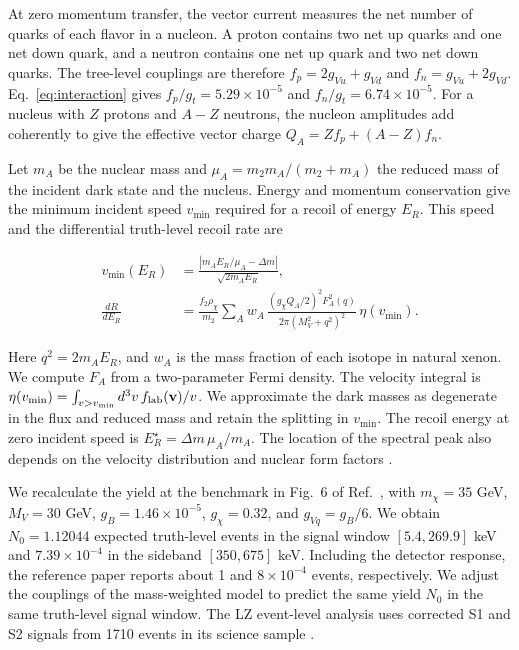 \documentclass[aps,prd,reprint,superscriptaddress,longbibliography,floatfix]{revtex4-2}
\begin{document}
At zero momentum transfer, the vector current measures the net number of quarks of each flavor in a nucleon. A proton contains two net up quarks and one net down quark, and a neutron contains one net up quark and two net down quarks. The tree-level couplings are therefore $f_p=2g_{Vu}+g_{Vd}$ and $f_n=g_{Vu}+2g_{Vd}$. Eq.~\eqref{eq:interaction} gives $f_p/g_t=5.29\times10^{-5}$ and $f_n/g_t=6.74\times10^{-5}$. For a nucleus with $Z$ protons and $A-Z$ neutrons, the nucleon amplitudes add coherently to give the effective vector charge $Q_A=Zf_p+(A-Z)f_n$.

Let $m_A$ be the nuclear mass and $\mu_A=m_2m_A/(m_2+m_A)$ the reduced mass of the incident dark state and the nucleus. Energy and momentum conservation give the minimum incident speed $v_{\min}$ required for a recoil of energy $E_R$. This speed and the differential truth-level recoil rate are

\begin{equation}
\label{eq:recoil}
\begin{aligned}
v_{\min}(E_R)&=\frac{|m_A E_R/\mu_A-\Delta m|}{\sqrt{2m_A E_R}},\\
\frac{dR}{dE_R}&=\frac{f_2\rho_\chi}{m_2}\sum_A w_A\,
\frac{(g_\chi Q_A/2)^2 F_A^2(q)}{2\pi(M_V^2+q^2)^2}\,\eta(v_{\min}).
\end{aligned}
\end{equation}

Here $q^2=2m_AE_R$, and $w_A$ is the mass fraction of each isotope in natural xenon. We compute $F_A$ from a two-parameter Fermi density. The velocity integral is $\eta(v_{\min})=\int_{v>v_{\min}}d^3v\,f_{\rm lab}(\mathbf v)/v$. We approximate the dark masses as degenerate in the flux and reduced mass and retain the splitting in $v_{\min}$. The recoil energy at zero incident speed is $E_R^\star=\Delta m\,\mu_A/m_A$. The location of the spectral peak also depends on the velocity distribution and nuclear form factors \cite{gemmell2026,deramo2016}.

We recalculate the yield at the benchmark in Fig.~6 of Ref.~\cite{gemmell2026}, with $m_\chi=35$ GeV, $M_V=30$ GeV, $g_B=1.46\times10^{-5}$, $g_\chi=0.32$, and $g_{Vq}=g_B/6$. We obtain $N_0=1.12044$ expected truth-level events in the signal window $[5.4,269.9]$ keV and $7.39\times10^{-4}$ in the sideband $[350,675]$ keV. Including the detector response, the reference paper reports about 1 and $8\times10^{-4}$ events, respectively. We adjust the couplings of the mass-weighted model to predict the same yield $N_0$ in the same truth-level signal window. The LZ event-level analysis uses corrected S1 and S2 signals from 1710 events in its science sample \cite{lz2026,gemmell2026,lzdata}.
\end{document}
